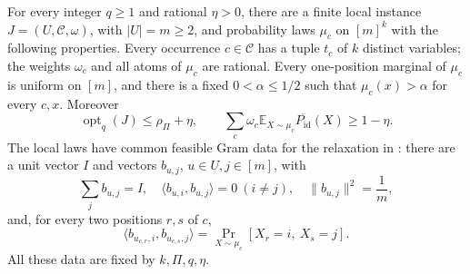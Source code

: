 \begin{lemma}\label{lem:ordering-local-data}
For every integer \(q\ge1\) and rational \(\eta>0\), there are a
finite local instance \(J=(U,\mathcal C,\omega)\), with
\(|U|=m\ge2\), and probability laws \(\mu_c\) on \([m]^k\) with the
following properties.  Every occurrence \(c\in\mathcal C\) has a tuple \(t_c\) of
\(k\) distinct variables;
the weights \(\omega_c\) and all atoms of \(\mu_c\) are rational.
Every one-position marginal of \(\mu_c\) is uniform on \([m]\), and
there is a fixed \(0<\alpha\le1/2\) such that
\(\mu_c(x)>\alpha\) for every \(c,x\).  Moreover
\begin{equation}
 \operatorname{opt}_q(J)\le\rho_\Pi+\eta,\qquad
 \sum_c\omega_c\mathbb E_{X\sim\mu_c}\overline{P_{\mathrm{id}}}(X)
 \ge1-\eta.
\label{eq:ordering-local-gap}
\end{equation}
The local laws have common feasible Gram data for the relaxation in
\cite[Section~8.3]{GuruswamiEtAl2011OrderingCSP}: there are a unit
vector \(I\) and vectors \(b_{u,j}\), \(u\in U,j\in[m]\), with
\[
 \sum_j b_{u,j}=I,\quad
 \langle b_{u,i},b_{u,j}\rangle=0\ (i\ne j),\quad
 \|b_{u,j}\|^2=\frac1m,
\]
and, for every two positions \(r,s\) of \(c\),
\begin{equation}
 \langle b_{u_{c,r},i},b_{u_{c,s},j}\rangle
 =\Pr_{X\sim\mu_c}[X_r=i,\ X_s=j].
\label{eq:ordering-local-moments}
\end{equation}
All these data are fixed by \(k,\Pi,q,\eta\).
\end{lemma}

